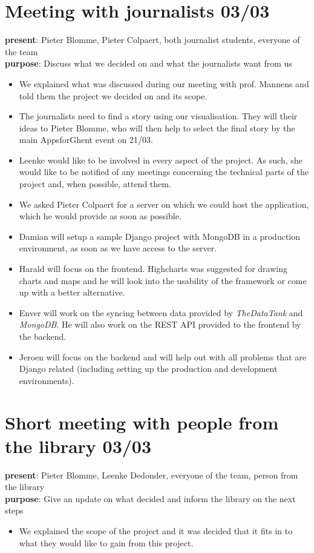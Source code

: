 \section{Meeting with journalists 03/03}
{\bf present}: Pieter Blomme, Pieter Colpaert, both journalist students, everyone of the team\\
{\bf purpose}: Discuss what we decided on and what the journalists want from us\\
\begin{itemize}
  \item We explained what was discussed during our meeting with prof. Mannens and told them the project we decided on and its scope.
  \item The journalists need to find a story using our visualisation. They will their ideas to Pieter Blomme, who will then help to select the final story by the main AppsforGhent event on 21/03.
  \item Leenke would like to be involved in every aspect of the project. As such, she would like to be notified of any meetings concerning the technical parts of the project and, when possible, attend them.
  \item We asked Pieter Colpaert for a server on which we could host the application, which he would provide as soon as possible.
  \item Damian will setup a sample Django project with MongoDB in a production environment, as soon as we have access to the server.
  \item Harald will focus on the frontend. Highcharts was suggested for drawing charts and maps and he will look into the usability of the framework or come up with a better alternative.
  \item Enver will work on the syncing between data provided by \emph{TheDataTank} and \emph{MongoDB}. He will also work on the REST API provided to the frontend by the backend.
  \item Jeroen will focus on the backend and will help out with all problems that are Django related (including setting up the production and development environments).
\end{itemize}

\section{Short meeting with people from the library 03/03}
{\bf present}: Pieter Blomme, Leenke Dedonder, everyone of the team, person from the library\\
{\bf purpose}: Give an update on what decided and inform the library on the next steps\\
\begin{itemize}
  \item We explained the scope of the project and it was decided that it fits in to what they would like to gain from this project.
\end{itemize}

